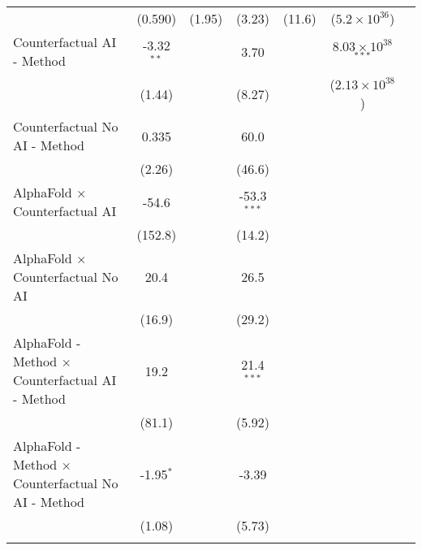 \begin{tabular}{lcccccc}
                                                              & (0.590)      & (1.95)       & (3.23)        & (11.6)      & ($5.2\times 10^{36}$)          &   \\   
   Counterfactual AI - Method                                 & -3.32$^{**}$ &              & 3.70          &             & $8.03\times 10^{38}$$^{***}$   &   \\   
                                                              & (1.44)       &              & (8.27)        &             & ($2.13\times 10^{38}$)         &   \\   
   Counterfactual No AI - Method                              & 0.335        &              & 60.0          &             &                                &   \\   
                                                              & (2.26)       &              & (46.6)        &             &                                &   \\   
   AlphaFold $\times$ Counterfactual AI                       & -54.6        &              & -53.3$^{***}$ &             &                                &   \\   
                                                              & (152.8)      &              & (14.2)        &             &                                &   \\   
   AlphaFold $\times$ Counterfactual No AI                    & 20.4         &              & 26.5          &             &                                &   \\   
                                                              & (16.9)       &              & (29.2)        &             &                                &   \\   
   AlphaFold - Method $\times$ Counterfactual AI - Method     & 19.2         &              & 21.4$^{***}$  &             &                                &   \\   
                                                              & (81.1)       &              & (5.92)        &             &                                &   \\   
   AlphaFold - Method $\times$ Counterfactual No AI - Method  & -1.95$^{*}$  &              & -3.39         &             &                                &   \\   
                                                              & (1.08)       &              & (5.73)        &             &                                &   \\   
$$
\end{tabular}
